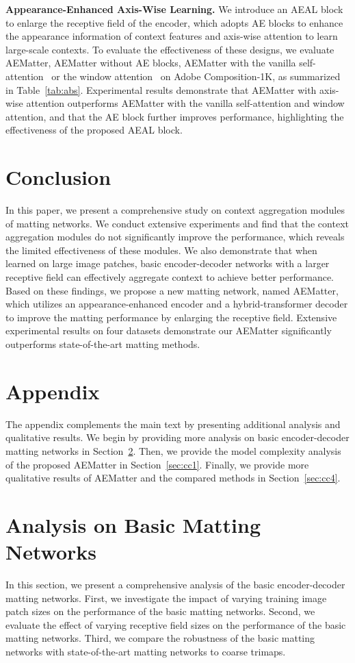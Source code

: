 \documentclass[10pt,twocolumn,letterpaper]{article}
\begin{document}
\noindent \textbf{Appearance-Enhanced Axis-Wise Learning.}
We introduce an AEAL block to enlarge the receptive field of the encoder, which adopts AE blocks to enhance the appearance information of context features and axis-wise attention to learn large-scale contexts. 
To evaluate the effectiveness of these designs, we evaluate AEMatter, AEMatter without AE blocks, AEMatter with the vanilla self-attention~\cite{vaswani2017attention} or the window attention~\cite{liu2021Swin} on Adobe Composition-1K, as summarized in Table~\ref{tab:abs}. 
Experimental results demonstrate that AEMatter with axis-wise attention outperforms AEMatter with the vanilla self-attention and
window attention, and that the AE block further improves performance, highlighting the effectiveness of the proposed AEAL block. 

\section{Conclusion}
In this paper, we present a comprehensive study on context aggregation modules of matting networks.
We conduct extensive experiments and find that the context aggregation modules do not significantly improve the performance, which reveals the limited effectiveness of these modules.
We also demonstrate that when learned on large image patches, basic encoder-decoder networks with a larger receptive field
can effectively aggregate context to achieve better performance.
Based on these findings, we propose a new matting network, named AEMatter, which utilizes an appearance-enhanced encoder and a hybrid-transformer decoder to improve the matting performance by enlarging the receptive field.
Extensive experimental results on four datasets demonstrate our AEMatter significantly outperforms state-of-the-art matting methods.

\setcounter{figure}{0}    
\setcounter{table}{0}    
\appendix
\section*{Appendix}
The appendix complements the main text by presenting additional analysis and qualitative results.
We begin by providing more analysis on basic encoder-decoder matting networks in Section~\ref{sec:cc3}.  
Then,  we provide the model complexity analysis of the proposed AEMatter in Section~\ref{sec:cc1}. 
Finally, we provide more qualitative results of AEMatter and the compared methods in Section~\ref{sec:cc4}. 

\section{Analysis on Basic Matting Networks}
\label{sec:cc3}
In this section, we present a comprehensive analysis of the basic encoder-decoder matting networks. 
First, we investigate the impact of varying  training image patch sizes on the performance of the basic matting networks.
Second, we evaluate the effect of varying receptive field sizes on the performance of the basic matting networks.
Third, we compare the robustness of the basic matting networks with state-of-the-art matting networks to coarse trimaps.
\end{document}
